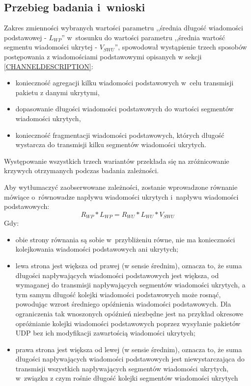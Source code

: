 \documentclass[a4paper, twoside, 12pt]{report}
\begin{document}
        \subsection{Przebieg badania i~wnioski}
            Zakres zmienności wybranych wartości parametru ,,średnia długość
            wiadomości podstawowej - \(  L_{WP} \)'' w~stosunku do wartości parametru
            ,,średnia wartość segmentu wiadomości ukrytej - \( V_{SWU} \)'',
            spowodował wystąpienie trzech sposobów postępowania z wiadomościami podstawowymi
            opisanych w sekcji \ref{CHANNELDESCRIPTION}:
        \begin{itemize}
            \item konieczność agregacji kilku wiadomości podstawowych w~celu transmisji pakietu z danymi ukrytymi,
            \item dopasowanie długości wiadomości podstawowych do wartości segmentów wiadomości ukrytych,
            \item konieczność fragmentacji wiadomości podstawowych, których długość wystarcza do transmisji kilku segmentów wiadomości ukrytych.
        \end{itemize}
            Występowanie wszystkich trzech wariantów przekłada
            się na zróżnicowanie krzywych otrzymanych podczas badania zależności.

            Aby wytłumaczyć zaobserwowane zależności, zostanie wprowadzone równanie
            mówiące o~równowadze napływu wiadomości ukrytych i~napływu wiadomości podstawowych:
            \begin{equation} \label{ROWNANIEROWNOWAGI}
            R_{WP} * L_{WP} = R_{WU} * L_{WU} * V_{SWU}
            \end{equation}
            Gdy:
            \begin{itemize}
                \item obie strony równania są sobie w~przybliżeniu równe, nie ma konieczności
            kolejkowania wiadomości podstawowych ani ukrytych;
                \item lewa strona jest
            większa od prawej (w sensie średnim), oznacza to, że suma długości napływających wiadomości podstawowych
            jest większa, od wymaganej do transmisji napływających segmentów wiadomości ukrytych,
            a tym samym długość kolejki wiadomości podstawowych może rosnąć, powodując
            wzrost średniego opóźnienia wiadomości podstawowych. Dla ograniczenia tak
            wnoszonych opóźnień niezbędne jest na przykład okresowe opróżnianie kolejki
            wiadomości podstawowych poprzez wysyłanie pakietów UDP bez ich modyfikacji
            zawartością wiadomości ukrytych;
                \item prawa strona jest
            większa od lewej (w sensie średnim), oznacza to, że suma długości napływających wiadomości
            podstawowych jest niewystarczająca do transmisji wszystkich napływających
            segmentów wiadomości ukrytych, w~związku z czym rośnie długość kolejki
            segmentów wiadomości ukrytych
    \end{itemize}
\end{document}
